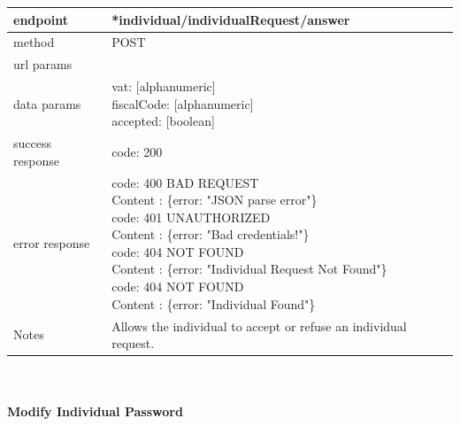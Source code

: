 \begin{legal}
\begin{legal}
\begin{itemize}
								\begin{tabularx}{\linewidth}{| l| l }
									\hline
									endpoint & *individual/individualRequest/answer \\
									\hline
									method & POST \\
									\hline
									url params & \\
									\hline
									data params &
									\parbox{0.7\textwidth}{
										\bigskip
										vat: [alphanumeric]\\
										fiscalCode: [alphanumeric]\\
										accepted: [boolean]
										\bigskip
									} \\
									\hline
									success response &
									\parbox{0.7\textwidth}{
										\bigskip
										code: 200
										\bigskip
									} \\
									\hline
									error response &
									\parbox{0.7\textwidth}{
										\bigskip
										code: 400 BAD REQUEST \\
										Content : \{error: "JSON parse error"\}\\
										code: 401 UNAUTHORIZED \\
										Content : \{error: "Bad credentials!"\}\\
										code: 404 NOT FOUND \\
										Content : \{error: "Individual Request Not Found"\}\\
										code: 404 NOT FOUND \\
										Content : \{error: "Individual Found"\}
										\bigskip
									} \\
									\hline
									Notes & 
									\parbox{0.7\textwidth}{
										\bigskip Allows the individual to accept or refuse an individual request.
									\bigskip}  \\
									\hline
								\end{tabularx}\\\\
								
								\textbf{Modify Individual Password}\\
				

\end{itemize}
\end{legal}
\end{legal}
